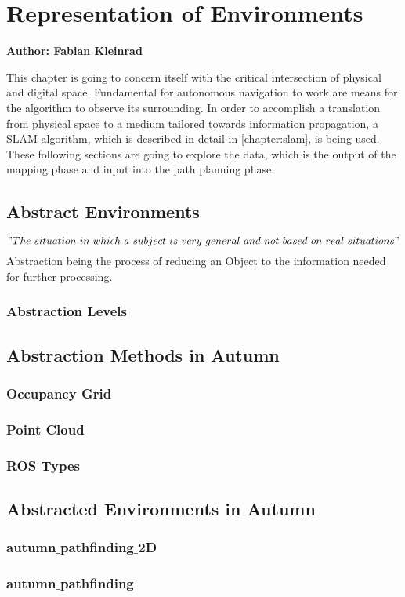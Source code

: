\chapter{Representation of Environments}

\textbf{Author: Fabian Kleinrad} 

This chapter is going to concern itself with the critical intersection of physical and digital space. Fundamental for autonomous navigation to work are means for the algorithm to observe its surrounding. In order to accomplish a translation from physical space to a medium tailored towards information propagation, a SLAM algorithm, which is described in detail in \ref{chapter:slam}, is being used. These following sections are going to explore the data, which is the output of the mapping phase and input into the path planning phase.

\section{Abstract Environments}

\["The\ situation\ in\ which\ a\ subject\ is\ very\ general \ and\ not\ based\ on\ real\ situations"\]
Abstraction being the process of reducing an Object to the information needed for further processing. 

\subsection{Abstraction Levels}

\section{Abstraction Methods in Autumn}

\subsection{Occupancy Grid}

\subsection{Point Cloud}

\subsection{ROS Types}

\section{Abstracted Environments in Autumn}

\subsection{autumn$\_$pathfinding$\_$2D}

\subsection{autumn$\_$pathfinding}